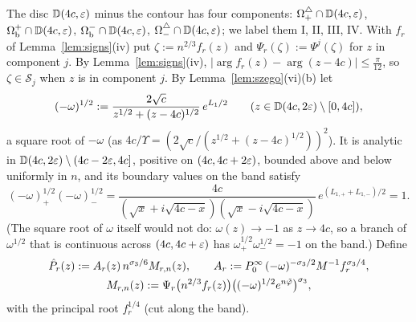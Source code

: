 The disc $\mathbb D(4c,\varepsilon)$ minus the contour has four components: $\Omega^{\triangle}_+\cap \mathbb D(4c,\varepsilon)$, $\Omega_{\mathrm{b}}^+\cap \mathbb D(4c,\varepsilon)$,
$\Omega_{\mathrm{b}}^-\cap \mathbb D(4c,\varepsilon)$, $\Omega^{\triangle}_-\cap \mathbb D(4c,\varepsilon)$; we label them I, II, III, IV. With $f_r$ of
Lemma~\ref{lem:signs}(iv) put $\zeta:=n^{2/3}f_r(z)$ and $\Psi_r(\zeta):=\Psi^j(\zeta)$ for $z$ in component $j$. By
Lemma~\ref{lem:signs}(iv), $|\arg f_r(z)-\arg(z-4c)|\le\frac\pi{12}$, so $\zeta\in\mathcal S_j$ when $z$ is in
component $j$. By Lemma~\ref{lem:szego}(vi)(b) let
\begin{equation}\label{eq:omega-root}
  (-\omega)^{1/2}:=\frac{2\sqrt c}{z^{1/2}+(z-4c)^{1/2}}\,e^{L_1/2}\qquad(z\in \mathbb D(4c,2\varepsilon)\setminus[0,4c]),
\end{equation}
a square root of $-\omega$ (as $4c/\Upsilon=(2\sqrt c/(z^{1/2}+(z-4c)^{1/2}))^2$). It is analytic in
$\mathbb D(4c,2\varepsilon)\setminus(4c-2\varepsilon,4c]$, positive on $(4c,4c+2\varepsilon)$, bounded above and below uniformly in $n$, and its
boundary values on the band satisfy
\begin{equation}\label{eq:omega-root-band}
  (-\omega)^{1/2}_+(-\omega)^{1/2}_-=\frac{4c}{(\sqrt x+i\sqrt{4c-x})(\sqrt x-i\sqrt{4c-x})}\,e^{(L_{1,+}+L_{1,-})/2}=1 .
\end{equation}
(The square root of $\omega$ itself would not do: $\omega(z)\to-1$ as $z\to4c$, so a branch of $\omega^{1/2}$ that is
continuous across $(4c,4c+\varepsilon)$ has $\omega^{1/2}_+\omega^{1/2}_-=-1$ on the band.) Define
\begin{equation}\label{eq:airy}
\begin{gathered}
  \hat P_r(z):=A_r(z)\,n^{\sigma_3/6}M_{r,n}(z),\qquad A_r:=P^\infty_0\,(-\omega)^{-\sigma_3/2}M^{-1}f_r^{\sigma_3/4},\\
  M_{r,n}(z):=\Psi_r\bigl(n^{2/3}f_r(z)\bigr)\bigl((-\omega)^{1/2}e^{n\tilde\varphi}\bigr)^{\sigma_3},
\end{gathered}
\end{equation}
with the principal root $f_r^{1/4}$ (cut along the band).

